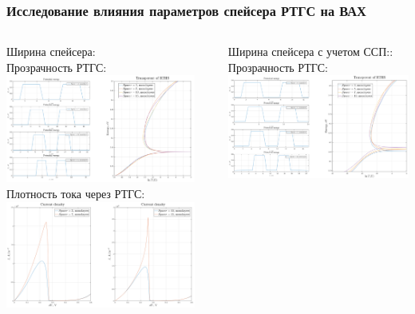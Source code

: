 \documentclass[10pt,pdf,hyperref={unicode},aspectratio={169}]{beamer}
\begin{document}
\begin{frame}
	\frametitle{Исследование влияния параметров спейсера РТГС на ВАХ}
	\begin{columns}
		{\color{blue} Ширина спейсера:}\\
		{\color{red} Прозрачность РТГС:}
	   	\includegraphics[width=.8\linewidth,center]{assets/qslt}\\
		{\color{red} Плотность тока через РТГС:}
	   	\includegraphics[width=.8\linewidth,center]{assets/qslj}
		\rule[-55mm]{0.2ex}{75mm}
		{\color{blue} Ширина спейсера с учетом ССП::}\\
		{\color{red} Прозрачность РТГС:}
	   	\includegraphics[width=.8\linewidth,center]{assets/qslqt}\\

\end{columns}
\end{frame}
\end{document}
